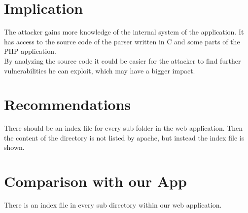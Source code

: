 \section{Implication}
The attacker gains more knowledge of the internal system of the application. It has access to the source code of the parser written in C and some parts of the PHP application. \\
By analyzing the source code it could be easier for the attacker to find further vulnerabilities he can exploit, which may have a bigger impact.

\section{Recommendations}
There should be an index file for every sub folder in the web application. Then the content of the directory is not listed by apache, but instead the index file is shown.

\section{Comparison with our App}
There is an index file in every sub directory within our web application.
